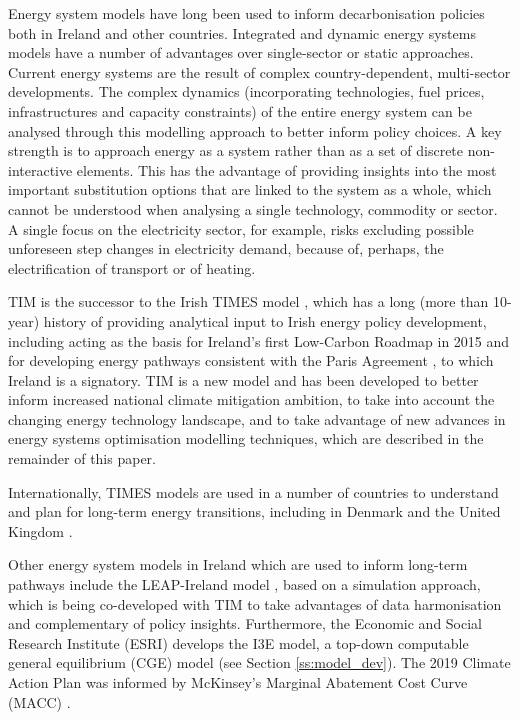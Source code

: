 \documentclass[gmd,manuscript]{copernicus}
\begin{document}
Energy system models have long been used to inform decarbonisation policies both in Ireland and other countries. Integrated and dynamic energy systems models have a number of advantages over single-sector or static approaches. Current energy systems are the result of complex country-dependent, multi-sector developments. The complex dynamics (incorporating technologies, fuel prices, infrastructures and capacity constraints) of the entire energy system can be analysed through this modelling approach to better inform policy choices. A key strength is to approach energy as a system rather than as a set of discrete non-interactive elements. This has the advantage of providing insights into the most important substitution options that are linked to the system as a whole, which cannot be understood when analysing a single technology, commodity or sector. A single focus on the electricity sector, for example, risks excluding possible unforeseen step changes in electricity demand, because of, perhaps, the electrification of transport or of heating. 

TIM is the successor to the Irish TIMES model \citep{EnvironmentalProtectionAgency2020}, which has a long (more than 10-year) history of providing analytical input to Irish energy policy development, including acting as the basis for Ireland’s first Low-Carbon Roadmap in 2015 \citep{Deane2013} and for developing energy pathways consistent with the Paris Agreement \citep{Glynn2019}, to which Ireland is a signatory. TIM is a new model and has been developed to better inform increased national climate mitigation ambition, to take into account the changing energy technology landscape, and to take advantage of new advances in energy systems optimisation modelling techniques, which are described in the remainder of this paper.

Internationally, TIMES models are used in a number of countries to understand and plan for long-term energy transitions, including in Denmark \citep{Balyk2019} and the United Kingdom \citep{fais2016impact,daly2015indirect}. 

Other energy system models in Ireland which are used to inform long-term pathways include the LEAP-Ireland model \citep{MacUidhir2020,rogan2014leaps}, based on a simulation approach, which is being co-developed with TIM to take advantages of data harmonisation and complementary of policy insights. Furthermore, the Economic and Social Research Institute (ESRI) develops the I3E model, a top-down computable general equilibrium (CGE) model (see Section \ref{ss:model_dev}). The 2019 Climate Action Plan was informed by McKinsey's Marginal Abatement Cost Curve (MACC) \citep{DCCAE2019}. 
\end{document}
